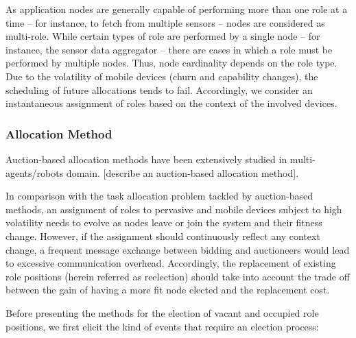 As application nodes are generally capable of performing more than one role at a time -- for instance, to fetch from multiple sensors -- nodes are considered as multi-role. While certain types of role are performed by a single node -- for instance, the sensor data aggregator -- there are cases in which a role must be performed by multiple nodes. Thus, node cardinality depends on the role type. Due to the volatility of mobile devices (churn and capability changes), the scheduling of future allocations tends to fail. Accordingly, we consider an instantaneous assignment of roles based on the context of the involved devices.

\subsubsection{\textbf{Allocation Method}} Auction-based allocation methods have been extensively studied in multi-agents/robots domain. [describe an auction-based allocation method].

In comparison with the task allocation problem tackled by auction-based methods, an assignment of roles to pervasive and mobile devices subject to high volatility needs to evolve as nodes leave or join the system and their fitness change. However, if the assignment should continuously reflect any context change, a frequent message exchange between bidding and auctioneers would lead to excessive communication overhead. Accordingly, the replacement of existing role positions (herein referred as reelection) should take into account the trade off between the gain of having a more fit node elected and the replacement cost. 


Before presenting the methods for the election of vacant and occupied role positions, we first elicit the kind of events that require an election process:

